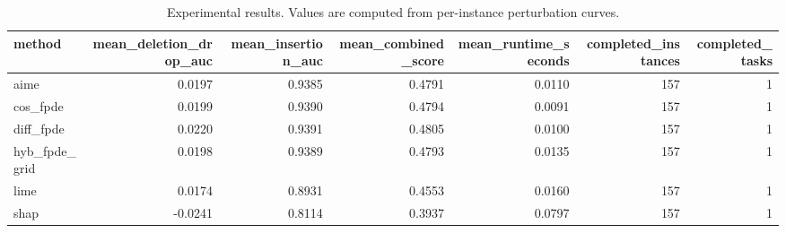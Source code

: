 \begin{table}[t]
\caption{Experimental results. Values are computed from per-instance perturbation curves.}
\label{tab:main_results_computed}
\centering
\begin{tabular}{lrrrrrr}
\toprule
method & mean\_deletion\_drop\_auc & mean\_insertion\_auc & mean\_combined\_score & mean\_runtime\_seconds & completed\_instances & completed\_tasks \\
\midrule
aime & 0.0197 & 0.9385 & 0.4791 & 0.0110 & 157 & 1 \\
cos\_fpde & 0.0199 & 0.9390 & 0.4794 & 0.0091 & 157 & 1 \\
diff\_fpde & 0.0220 & 0.9391 & 0.4805 & 0.0100 & 157 & 1 \\
hyb\_fpde\_grid & 0.0198 & 0.9389 & 0.4793 & 0.0135 & 157 & 1 \\
lime & 0.0174 & 0.8931 & 0.4553 & 0.0160 & 157 & 1 \\
shap & -0.0241 & 0.8114 & 0.3937 & 0.0797 & 157 & 1 \\
\bottomrule
\end{tabular}

\end{table}
